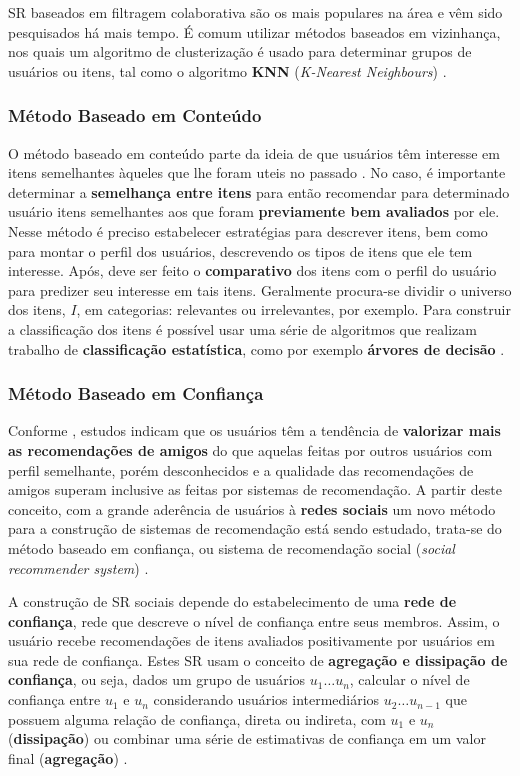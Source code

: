 \documentclass[12pt]{article}
\begin{document}
SR baseados em filtragem colaborativa são os mais populares na área e vêm sido pesquisados há mais tempo. \cite{ricci2011introduction} 
É comum utilizar métodos baseados em vizinhança, nos quais um algoritmo de clusterização é usado para determinar grupos 
de usuários ou itens, tal como o algoritmo \textbf{KNN} (\textit{K-Nearest Neighbours}) \cite{da2018desenvolvimento}.

\subsubsection{Método Baseado em Conteúdo}

O método baseado em conteúdo parte da ideia de que usuários têm interesse em itens semelhantes àqueles que lhe foram uteis 
no passado \cite{ricci2011introduction}. No caso, é importante determinar a \textbf{semelhança entre itens} para então recomendar 
para determinado usuário itens semelhantes aos que foram \textbf{previamente bem avaliados} por ele. Nesse método 
é preciso estabelecer estratégias para descrever itens, bem como para montar o perfil dos usuários, descrevendo os tipos 
de itens que ele tem interesse. Após, deve ser feito o \textbf{comparativo} dos itens com o perfil do usuário para 
predizer seu interesse em tais itens. Geralmente procura-se dividir o universo dos itens, $I$, em categorias: relevantes ou 
irrelevantes, por exemplo. Para construir a classificação dos itens é possível usar uma série de algoritmos que 
realizam trabalho de \textbf{classificação estatística}, como por exemplo \textbf{árvores de decisão} \cite{pazzani2007content}. 

\subsubsection{Método Baseado em Confiança}

Conforme \cite{sinha2001comparing}, estudos indicam que os usuários têm a tendência de \textbf{valorizar mais as recomendações de amigos} do que aquelas feitas por outros usuários com perfil semelhante, porém desconhecidos e a qualidade das recomendações de amigos superam inclusive as feitas por sistemas de recomendação. A partir deste conceito, com a grande aderência de usuários 
à \textbf{redes sociais} um novo método para a construção de sistemas de recomendação está sendo estudado, trata-se do método 
baseado em confiança, ou sistema de recomendação social (\textit{social recommender system}) \cite{ricci2011introduction}.

A construção de SR sociais depende do estabelecimento de uma \textbf{rede de confiança}, rede que descreve 
o nível de confiança entre seus membros. Assim, o usuário recebe recomendações de itens avaliados positivamente por usuários 
em sua rede de confiança. Estes SR usam o conceito de \textbf{agregação e dissipação de confiança}, ou seja, 
dados um grupo de usuários $u_1  \dots u_n$, calcular o nível de confiança entre $u_1$ e $u_n$ considerando usuários intermediários
$u_2 \dots u_{n-1}$ que possuem alguma relação de confiança, direta ou indireta, com $u_1$ e $u_n$ (\textbf{dissipação}) ou 
combinar uma série de estimativas de confiança em um valor final (\textbf{agregação}) \cite{victor2011trust}.
\end{document}
